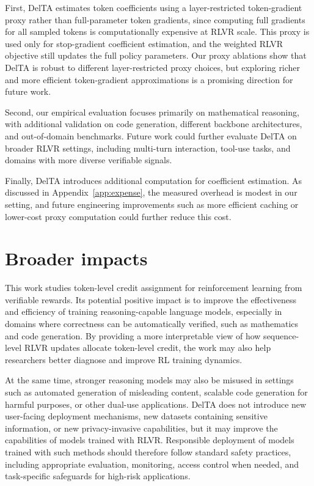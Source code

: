 \documentclass{article} %
\begin{document}
First, DelTA estimates token coefficients using a layer-restricted token-gradient proxy rather than full-parameter token gradients, since computing full gradients for all sampled tokens is computationally expensive at RLVR scale. 
This proxy is used only for stop-gradient coefficient estimation, and the weighted RLVR objective still updates the full policy parameters. 
Our proxy ablations show that DelTA is robust to different layer-restricted proxy choices, but exploring richer and more efficient token-gradient approximations is a promising direction for future work.

Second, our empirical evaluation focuses primarily on mathematical reasoning, with additional validation on code generation, different backbone architectures, and out-of-domain benchmarks. 
Future work could further evaluate DelTA on broader RLVR settings, including multi-turn interaction, tool-use tasks, and domains with more diverse verifiable signals. 

Finally, DelTA introduces additional computation for coefficient estimation. 
As discussed in Appendix~\ref{app:expense}, the measured overhead is modest in our setting, and future engineering improvements such as more efficient caching or lower-cost proxy computation could further reduce this cost.

\section{Broader impacts}
This work studies token-level credit assignment for reinforcement learning from verifiable rewards. 
Its potential positive impact is to improve the effectiveness and efficiency of training reasoning-capable language models, especially in domains where correctness can be automatically verified, such as mathematics and code generation. 
By providing a more interpretable view of how sequence-level RLVR updates allocate token-level credit, the work may also help researchers better diagnose and improve RL training dynamics.

At the same time, stronger reasoning models may also be misused in settings such as automated generation of misleading content, scalable code generation for harmful purposes, or other dual-use applications. 
DelTA does not introduce new user-facing deployment mechanisms, new datasets containing sensitive information, or new privacy-invasive capabilities, but it may improve the capabilities of models trained with RLVR. 
Responsible deployment of models trained with such methods should therefore follow standard safety practices, including appropriate evaluation, monitoring, access control when needed, and task-specific safeguards for high-risk applications.
\end{document}

